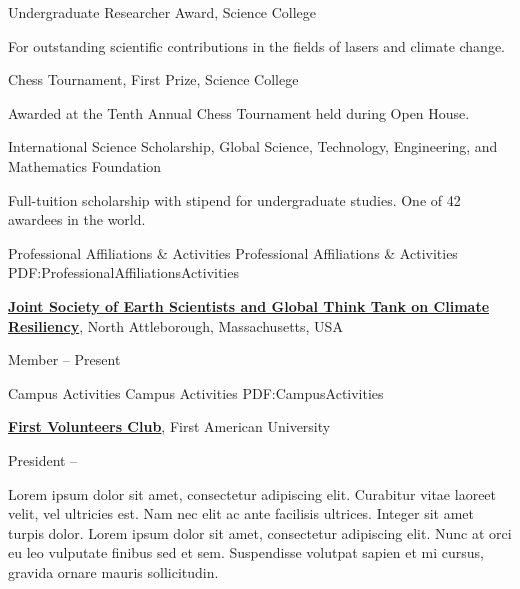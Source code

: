 \documentclass[letterpaper,MMMyyyy,nonstopmode]{simpleresumecv}
\begin{document}
\begin{Body}
\begin{Detail}
\begin{Detail}
\begin{Detail}
\Gap
\BulletItem
Undergraduate Researcher Award,
Science College
\hfill
{}
\begin{Detail}
\Item
For outstanding scientific contributions in the fields of lasers and climate change.
\end{Detail}

\Gap
\BulletItem
Chess Tournament,
First Prize,
Science College
\hfill
{}
\begin{Detail}
\Item
Awarded at the Tenth Annual Chess Tournament held during Open House.
\end{Detail}

\Gap
\BulletItem
International Science Scholarship,
\hfill
{}
\newline
Global Science, Technology, Engineering, and Mathematics Foundation
\begin{Detail}
\Item
Full-tuition scholarship with stipend for undergraduate studies.
One of 42 awardees in the world.
\end{Detail}


\Section
{Professional Affiliations\newline
\& Activities}
{Professional Affiliations \& Activities}
{PDF:ProfessionalAffiliationsActivities}

\Entry
\href{http://www.example.com/my-society}
{\textbf{Joint Society of Earth Scientists and Global Think Tank on Climate Resiliency}},
\newline
North Attleborough, Massachusetts, USA

\Gap
\BulletItem
Member
\hfill
{} --
Present

\newpage


\Section
{Campus Activities}
{Campus Activities}
{PDF:CampusActivities}

\Entry
\href{http://www.example.com/my-club}
{\textbf{First Volunteers Club}},
First American University

\Gap
\BulletItem
President
\hfill
{} --
\begin{Detail}
\SubBulletItem
Lorem ipsum dolor sit amet, consectetur adipiscing elit.
\SubBulletItem
Curabitur vitae laoreet velit, vel ultricies est. Nam nec elit ac ante facilisis ultrices.
\SubBulletItem
Integer sit amet turpis dolor. Lorem ipsum dolor sit amet, consectetur adipiscing elit. Nunc at orci eu leo vulputate finibus sed et sem.
\SubBulletItem
Suspendisse volutpat sapien et mi cursus, gravida ornare mauris sollicitudin.
\end{Detail}


\end{Detail}
\end{Detail}
\end{Detail}
\end{Body}
\end{document}
